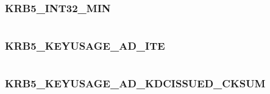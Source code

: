 \documentclass[letterpaper,10pt,english]{sphinxmanual}
\begin{document}
\subsubsection{KRB5\_INT32\_MIN}
\label{appdev/refs/macros/KRB5_INT32_MIN:krb5-int32-min-data}\label{appdev/refs/macros/KRB5_INT32_MIN::doc}\label{appdev/refs/macros/KRB5_INT32_MIN:krb5-int32-min}

\begin{fulllineitems}
\label{appdev/refs/macros/KRB5_INT32_MIN:KRB5_INT32_MIN}
\end{fulllineitems}


\begin{tabulary}{\linewidth}{|L|L|}
\hline

 & 
\\
\hline\end{tabulary}



\subsubsection{KRB5\_KEYUSAGE\_AD\_ITE}
\label{appdev/refs/macros/KRB5_KEYUSAGE_AD_ITE:krb5-keyusage-ad-ite-data}\label{appdev/refs/macros/KRB5_KEYUSAGE_AD_ITE:krb5-keyusage-ad-ite}\label{appdev/refs/macros/KRB5_KEYUSAGE_AD_ITE::doc}

\begin{fulllineitems}
\label{appdev/refs/macros/KRB5_KEYUSAGE_AD_ITE:KRB5_KEYUSAGE_AD_ITE}
\end{fulllineitems}


\begin{tabulary}{\linewidth}{|L|L|}
\hline

 & 
\\
\hline\end{tabulary}



\subsubsection{KRB5\_KEYUSAGE\_AD\_KDCISSUED\_CKSUM}
\label{appdev/refs/macros/KRB5_KEYUSAGE_AD_KDCISSUED_CKSUM::doc}\label{appdev/refs/macros/KRB5_KEYUSAGE_AD_KDCISSUED_CKSUM:krb5-keyusage-ad-kdcissued-cksum-data}\label{appdev/refs/macros/KRB5_KEYUSAGE_AD_KDCISSUED_CKSUM:krb5-keyusage-ad-kdcissued-cksum}
\end{document}
